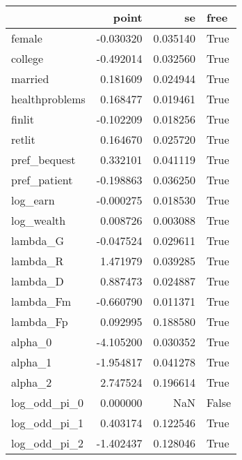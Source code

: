 \begin{tabular}{lrrl}
\toprule
{} &     point &        se &   free \\
\midrule
female         & -0.030320 &  0.035140 &   True \\
college        & -0.492014 &  0.032560 &   True \\
married        &  0.181609 &  0.024944 &   True \\
healthproblems &  0.168477 &  0.019461 &   True \\
finlit         & -0.102209 &  0.018256 &   True \\
retlit         &  0.164670 &  0.025720 &   True \\
pref\_bequest   &  0.332101 &  0.041119 &   True \\
pref\_patient   & -0.198863 &  0.036250 &   True \\
log\_earn       & -0.000275 &  0.018530 &   True \\
log\_wealth     &  0.008726 &  0.003088 &   True \\
lambda\_G       & -0.047524 &  0.029611 &   True \\
lambda\_R       &  1.471979 &  0.039285 &   True \\
lambda\_D       &  0.887473 &  0.024887 &   True \\
lambda\_Fm      & -0.660790 &  0.011371 &   True \\
lambda\_Fp      &  0.092995 &  0.188580 &   True \\
alpha\_0        & -4.105200 &  0.030352 &   True \\
alpha\_1        & -1.954817 &  0.041278 &   True \\
alpha\_2        &  2.747524 &  0.196614 &   True \\
log\_odd\_pi\_0   &  0.000000 &       NaN &  False \\
log\_odd\_pi\_1   &  0.403174 &  0.122546 &   True \\
log\_odd\_pi\_2   & -1.402437 &  0.128046 &   True \\
\bottomrule
\end{tabular}

